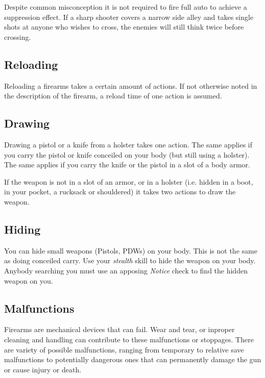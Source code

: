 Despite common misconception it is not required to fire full auto to achieve
a suppression effect. If a sharp shooter covers a narrow side alley and takes
single shots at anyone who wishes to cross, the enemies will still think twice
before crossing.

\subsection{Reloading}
\label{sub:7-Reloading}

Reloading a firearms takes a certain amount of actions. If not otherwise noted
in the description of the firearm, a reload time of one action is assumed.

\subsection{Drawing}
\label{sub:7-Drawing}

Drawing a pistol or a knife from a holster takes one action. The same applies
if you carry the pistol or knife conceiled on your body (but still using a
holster). The same applies if you carry the knife or the pistol in a slot of
a body armor.

If the weapon is not in a slot of an armor, or in a holster (i.e. hidden in
a boot, in your pocket, a rucksack or shouldered) it takes two actions to
draw the weapon.

\subsection{Hiding}
\label{sub:7-Hiding}

You can hide small weapons (Pistols, PDWs) on your body. This is not the same
as doing conceiled carry. Use your \emph{stealth} skill to hide the weapon on
your body. Anybody searching you must use an apposing \emph{Notice} check to
find the hidden weapon on you.

\subsection{Malfunctions}
\label{sub:7-Malfunctions}

Firearms are mechanical devices that can fail. Wear and tear, or inproper
cleaning and handling can contribute to these malfunctions or stoppages. There
are variety of possible malfunctions, ranging from temporary to relative save
malfunctions to potentially dangerous ones that can permanently damage the gun
or cause injury or death.

